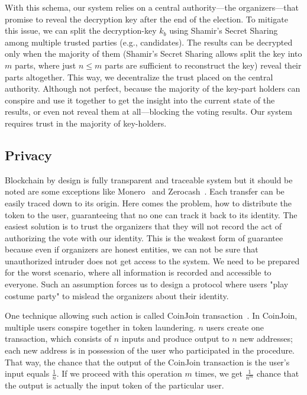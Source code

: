 \documentclass[applsci,article,submit,moreauthors,pdftex]{Definitions/mdpi}
\begin{document}
With this schema, our system relies on a central authority––the organizers––that promise to reveal the decryption key after the end of the election. To mitigate this issue, we can split the decryption-key $k_b$ using Shamir's Secret Sharing~\cite{shamir1979share} among multiple trusted parties (e.g., candidates). The results can be decrypted only when the majority of them (Shamir's Secret Sharing allows split the key into $m$ parts, where just $n \leq m$ parts are sufficient to reconstruct the key) reveal their parts altogether.  This way, we decentralize the trust placed on the central authority. Although not perfect, because the majority of the key-part holders can conspire and use it together to get the insight into the current state of the results, or even not reveal them at all––blocking the voting results. Our system requires trust in the majority of key-holders.

\subsection{Privacy}
\label{privacy}
Blockchain by design is fully transparent and traceable system but it should be noted  are some exceptions like Monero~\cite{van2013cryptonote} and Zerocash~\cite{sasson2014zerocash}. Each transfer can be easily traced down to its origin. Here comes the problem, how to distribute the token to the user, guaranteeing that no one can track it back to its identity. The easiest solution is to trust the organizers that they will not record the act of authorizing the vote with our identity. This is the weakest form of guarantee because even if organizers are honest entities, we can not be sure that unauthorized intruder does not get access to the system. We need to be prepared for the worst scenario, where all information is recorded and accessible to everyone. Such an assumption forces us to design a protocol where users "play costume party" to mislead the organizers about their identity. 

One technique allowing such action is called CoinJoin transaction~\cite{CoinJoin41:online}. In CoinJoin, multiple users conspire together in token laundering. $n$ users create one transaction, which consists of $n$ inputs and produce output to $n$ new addresses; each new address is in possession of the user who participated in the procedure. That way, the chance that the output of the CoinJoin transaction is the user's input equals $\frac{1}{n}$. If we proceed with this operation $m$ times, we get $\frac{1}{n^m}$ chance that the output is actually the input token of the particular user. 
\end{document}
